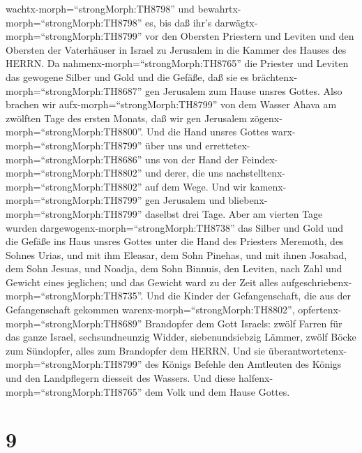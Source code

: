 wachtx-morph=``strongMorph:TH8798'' und
bewahrtx-morph=``strongMorph:TH8798'' es, bis daß ihr's
darwägtx-morph=``strongMorph:TH8799'' vor den Obersten Priestern und
Leviten und den Obersten der Vaterhäuser in Israel zu Jerusalem in die
Kammer des Hauses des HERRN.  Da
nahmenx-morph=``strongMorph:TH8765'' die Priester und Leviten das
gewogene Silber und Gold und die Gefäße, daß sie es
brächtenx-morph=``strongMorph:TH8687'' gen Jerusalem zum Hause unsres
Gottes.  Also brachen wir aufx-morph=``strongMorph:TH8799''
von dem Wasser Ahava am zwölften Tage des ersten Monats, daß wir gen
Jerusalem zögenx-morph=``strongMorph:TH8800''. Und die Hand unsres
Gottes warx-morph=``strongMorph:TH8799'' über uns und
errettetex-morph=``strongMorph:TH8686'' uns von der Hand der
Feindex-morph=``strongMorph:TH8802'' und derer, die uns
nachstelltenx-morph=``strongMorph:TH8802'' auf dem Wege. 
Und wir kamenx-morph=``strongMorph:TH8799'' gen Jerusalem und
bliebenx-morph=``strongMorph:TH8799'' daselbst drei Tage. 
Aber am vierten Tage wurden dargewogenx-morph=``strongMorph:TH8738'' das
Silber und Gold und die Gefäße ins Haus unsres Gottes unter die Hand des
Priesters Meremoth, des Sohnes Urias, und mit ihm Eleasar, dem Sohn
Pinehas, und mit ihnen Josabad, dem Sohn Jesuas, und Noadja, dem Sohn
Binnuis, den Leviten,  nach Zahl und Gewicht eines
jeglichen; und das Gewicht ward zu der Zeit alles
aufgeschriebenx-morph=``strongMorph:TH8735''.  Und die
Kinder der Gefangenschaft, die aus der Gefangenschaft gekommen
warenx-morph=``strongMorph:TH8802'',
opfertenx-morph=``strongMorph:TH8689'' Brandopfer dem Gott Israels:
zwölf Farren für das ganze Israel, sechsundneunzig Widder,
siebenundsiebzig Lämmer, zwölf Böcke zum Sündopfer, alles zum Brandopfer
dem HERRN.  Und sie
überantwortetenx-morph=``strongMorph:TH8799'' des Königs Befehle den
Amtleuten des Königs und den Landpflegern diesseit des Wassers. Und
diese halfenx-morph=``strongMorph:TH8765'' dem Volk und dem Hause
Gottes.

\hypertarget{section-8}{%
\section{9}\label{section-8}}

